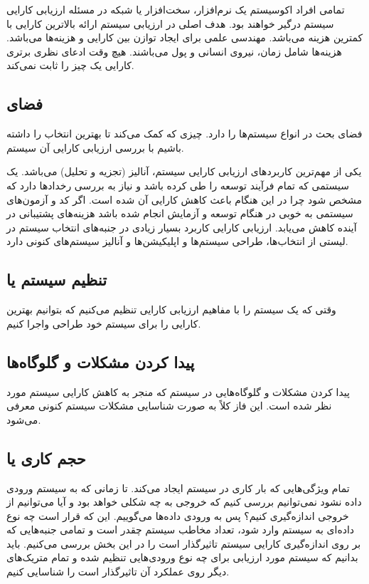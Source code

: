 \documentclass[a4paper]{article}
\begin{document}
تمامی افراد اکوسیستم یک نرم‌افزار، سخت‌افزار یا شبکه در مسئله ارزیابی کارایی
سیستم درگیر خواهند بود. هدف اصلی در ارزیابی سیستم ارائه بالاترین کارایی با
کمترین هزینه می‌باشد. مهندسی علمی برای ایجاد توازن بین کارایی و هزینه‌ها
می‌باشد. هزینه‌ها شامل زمان، نیروی انسانی و پول می‌باشند. هیچ وقت ادعای نظری
برتری کارایی یک چیز را ثابت نمی‌کند.

\subsection{فضای }

فضای  بحث در انواع سیستم‌ها را دارد. چیزی که کمک می‌کند تا بهترین
انتخاب را داشته باشیم با بررسی ارزیابی کارایی آن سیستم.

یکی از مهم‌ترین کاربرد‌های ارزیابی کارایی سیستم، آنالیز (تجزیه و تحلیل) می‌باشد.
یک سیستمی که تمام فرآیند توسعه را طی کرده باشد و نیاز به بررسی رخداد‌ها دارد که
مشخص شود چرا در این هنگام باعث کاهش کارایی آن شده است. اگر کد و آزمون‌های سیستمی
به خوبی در هنگام توسعه و آزمایش انجام شده باشد هزینه‌های پشتیبانی در آینده کاهش
می‌یابد. ارزیابی کارایی کاربرد بسیار زیادی در جنبه‌های انتخاب سیستم در لیستی از
انتخاب‌ها، طراحی سیستم‌ها و اپلیکیشن‌ها و آنالیز سیستم‌های کنونی دارد.

\subsection{تنظیم سیستم یا }

وقتی که یک سیستم را با مفاهیم ارزیابی کارایی تنظیم می‌کنیم که بتوانیم بهترین
کارایی را برای سیستم خود طراحی واجرا کنیم.

\subsection{پیدا کردن مشکلات و گلوگاه‌ها }

پیدا کردن مشکلات و گلوگاه‌هایی در سیستم که منجر به کاهش کارایی سیستم مورد نظر
شده است. این فاز کلاً به صورت شناسایی مشکلات سیستم کنونی معرفی می‌شود.

\subsection{حجم کاری یا }

تمام ویژگی‌هایی که بار کاری در سیستم ایجاد می‌کند. تا زمانی که به سیستم ورودی
داده نشود نمی‌توانیم بررسی کنیم که خروجی به چه شکلی خواهد بود و آیا می‌توانیم از
خروجی اندازه‌گیری کنیم؟ پس به ورودی داده‌ها  می‌گوییم. این که قرار
است چه نوع داده‌ای به سیستم وارد شود، تعداد مخاطب سیستم چقدر است و تمامی
جنبه‌هایی که بر روی اندازه‌گیری کارایی سیستم تاثیرگذار است را در این بخش بررسی
می‌کنیم. باید بدانیم که سیستم مورد ارزیابی برای چه نوع ورودی‌هایی تنظیم شده و
تمام متریک‌های دیگر روی عملکرد آن تاثیرگذار است را شناسایی کنیم.
\end{document}
